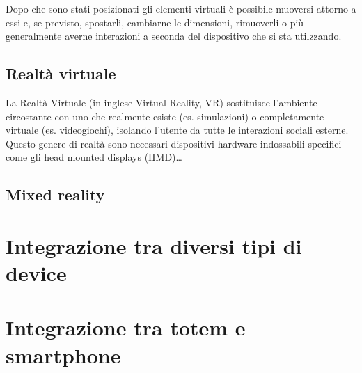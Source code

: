 Dopo che sono stati posizionati gli elementi virtuali è possibile muoversi attorno a essi e, se previsto, spostarli, cambiarne le dimensioni, rimuoverli o più generalmente averne interazioni a seconda del dispositivo che si sta utilzzando.


%
\subsection{Realtà virtuale}
La Realtà Virtuale (in inglese Virtual Reality, VR) sostituisce l'ambiente circostante con uno che realmente esiste (es. simulazioni) o completamente virtuale (es. videogiochi), isolando l'utente da tutte le interazioni sociali esterne. Questo genere di realtà sono necessari dispositivi hardware indossabili specifici come gli head mounted displays (HMD)\dots

\subsection{Mixed reality}

%
\section{Integrazione tra diversi tipi di device}
\section{Integrazione tra totem e smartphone}